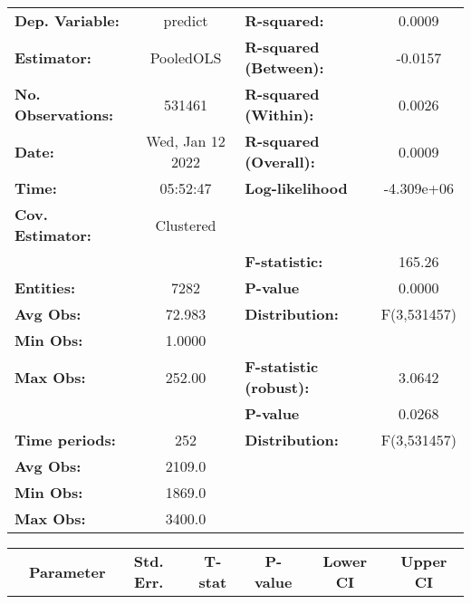 \begin{center}
\begin{tabular}{lclc}
\toprule
\textbf{Dep. Variable:}    &      predict       & \textbf{  R-squared:         }   &      0.0009      \\
\textbf{Estimator:}        &     PooledOLS      & \textbf{  R-squared (Between):}  &     -0.0157      \\
\textbf{No. Observations:} &       531461       & \textbf{  R-squared (Within):}   &      0.0026      \\
\textbf{Date:}             &  Wed, Jan 12 2022  & \textbf{  R-squared (Overall):}  &      0.0009      \\
\textbf{Time:}             &      05:52:47      & \textbf{  Log-likelihood     }   &    -4.309e+06    \\
\textbf{Cov. Estimator:}   &     Clustered      & \textbf{                     }   &                  \\
\textbf{}                  &                    & \textbf{  F-statistic:       }   &      165.26      \\
\textbf{Entities:}         &        7282        & \textbf{  P-value            }   &      0.0000      \\
\textbf{Avg Obs:}          &       72.983       & \textbf{  Distribution:      }   &   F(3,531457)    \\
\textbf{Min Obs:}          &       1.0000       & \textbf{                     }   &                  \\
\textbf{Max Obs:}          &       252.00       & \textbf{  F-statistic (robust):} &      3.0642      \\
\textbf{}                  &                    & \textbf{  P-value            }   &      0.0268      \\
\textbf{Time periods:}     &        252         & \textbf{  Distribution:      }   &   F(3,531457)    \\
\textbf{Avg Obs:}          &       2109.0       & \textbf{                     }   &                  \\
\textbf{Min Obs:}          &       1869.0       & \textbf{                     }   &                  \\
\textbf{Max Obs:}          &       3400.0       & \textbf{                     }   &                  \\
\bottomrule
\end{tabular}
\begin{tabular}{lcccccc}
                & \textbf{Parameter} & \textbf{Std. Err.} & \textbf{T-stat} & \textbf{P-value} & \textbf{Lower CI} & \textbf{Upper CI}  \\

\end{tabular}
\end{center}
